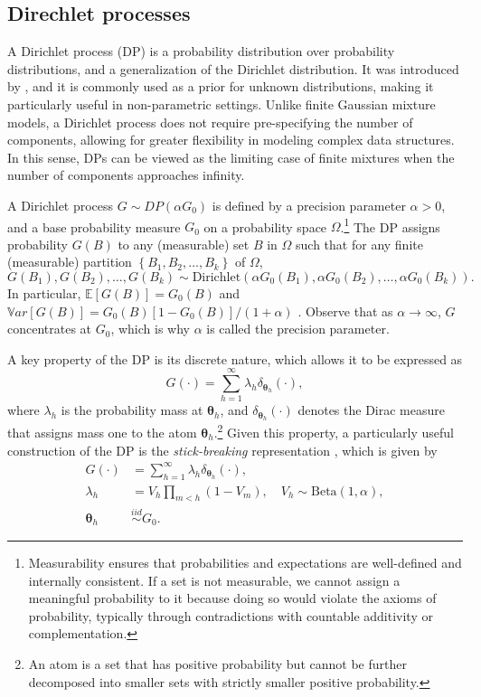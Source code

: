 \subsection{Direchlet processes}\label{sec11_12}

A Dirichlet process (DP) is a probability distribution over probability distributions, and a generalization of the Dirichlet distribution. It was introduced by \cite{Ferguson1973}, and it is commonly used as a prior for unknown distributions, making it particularly useful in non-parametric settings. Unlike finite Gaussian mixture models, a Dirichlet process does not require pre-specifying the number of components, allowing for greater flexibility in modeling complex data structures. In this sense, DPs can be viewed as the limiting case of finite mixtures when the number of components approaches infinity. 

A Dirichlet process $G\sim DP(\alpha G_0)$ is defined by a precision parameter $\alpha>0$, and a base probability measure $G_0$ on a probability space $\Omega$.\footnote{Measurability ensures that probabilities and expectations are well-defined and internally consistent. If a set is not measurable, we cannot assign a meaningful probability to it because doing so would violate the axioms of probability, typically through contradictions with countable additivity or complementation.} The DP assigns probability $G(B)$ to any (measurable) set $B$ in $\Omega$ such that for any finite (measurable) partition $\left\{B_1, B_2, \dots, B_k\right\}$ of $\Omega$,  
\[
G(B_1), G(B_2), \dots, G(B_k) \sim \text{Dirichlet}(\alpha G_0(B_1), \alpha G_0(B_2), \dots, \alpha G_0(B_k)).
\]
In particular, $\mathbb{E}\left[G(B)\right]=G_0(B)$ and $\mathbb{V}ar\left[G(B)\right]=G_0(B)\left[1-G_0(B)\right]/(1+\alpha)$ \cite[p.~8]{Muller2015}. Observe that as $\alpha  \rightarrow \infty$, $G$ concentrates at $G_0$, which is why $\alpha$ is called the precision parameter.

A key property of the DP is its discrete nature, which allows it to be expressed as  
\[
G(\cdot)=\sum_{h=1}^{\infty}\lambda_h\delta_{\boldsymbol{\theta}_h}(\cdot),
\]
where $\lambda_h$ is the probability mass at $\boldsymbol{\theta}_h$, and $\delta_{\boldsymbol{\theta}_h}(\cdot)$ denotes the Dirac measure that assigns mass one to the atom $\boldsymbol{\theta}_h$.\footnote{An atom is a set that has positive probability but cannot be further decomposed into smaller sets with strictly smaller positive probability.} Given this property, a particularly useful construction of the DP is the \textit{stick-breaking} representation \cite{Sethuraman1994}, which is given by  
\begin{align*}
	G(\cdot)&=\sum_{h=1}^{\infty}\lambda_h\delta_{\boldsymbol{\theta}_h}(\cdot),\\
	\lambda_h&=V_h\prod_{m<h}(1-V_m), \quad V_h\sim \text{Beta}(1,\alpha),\\
	\boldsymbol{\theta}_h&\stackrel{iid}{\sim} G_0.
\end{align*}  

